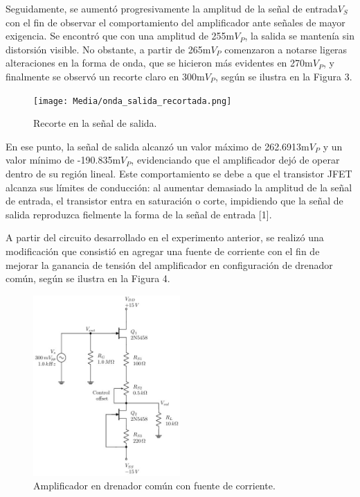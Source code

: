 \documentclass[journal]{IEEEtran}
\begin{document}
\par Seguidamente, se aumentó progresivamente la amplitud de la señal de entrada\( V_S \) con el fin de observar el comportamiento del amplificador ante señales de mayor exigencia. Se encontró que con una amplitud de 255m\( V_P \), la salida se mantenía sin distorsión visible. No obstante, a partir de 265m\( V_P \) comenzaron a notarse ligeras alteraciones en la forma de onda, que se hicieron más evidentes en 270m\( V_P \), y finalmente se observó un recorte claro en 300m\( V_P \), según se ilustra en la Figura 3.
\begin{figure}[H]
    \centering
    \texttt{[image: Media/onda\_salida\_recortada.png]}
    \caption{Recorte en la señal de salida.}
    \label{fig:onda_salida_recortada.}
\end{figure}
\par En ese punto, la señal de salida alcanzó un valor máximo de 262.6913m\( V_P \) y un valor mínimo de -190.835m\( V_P \), evidenciando que el amplificador dejó de operar dentro de su región lineal. Este comportamiento se debe a que el transistor JFET alcanza sus límites de conducción: al aumentar demasiado la amplitud de la señal de entrada, el transistor entra en saturación o corte, impidiendo que la señal de salida reproduzca fielmente la forma de la señal de entrada [1].
\par A partir del circuito desarrollado en el experimento anterior, se realizó una modificación que consistió en agregar una fuente de corriente con el fin de mejorar la ganancia de tensión del amplificador en configuración de drenador común, según se ilustra en la Figura 4.
\begin{figure}[H]
    \centering
    \includegraphics[width=0.5\textwidth]{Media/amplificador_fuente_corriente.png}
    \caption{Amplificador en drenador común con fuente de corriente.}
    \label{fig:amplificador_fuente_corriente.}
\end{figure}
\end{document}
